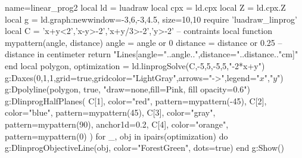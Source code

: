 \begin{luadraw}{name=linear_prog2}
local ld = luadraw
local cpx = ld.cpx
local Z = ld.cpx.Z
local g = ld.graph:new{window={-3,6,-3,4.5}, size={10,10}}
require 'luadraw_linprog'
local C = {'x+y<2','x-y>-2','x+y/3>-2','y>-2'} -- contraints
local function mypattern(angle, distance)
    angle = angle or 0
    distance = distance or 0.25 -- distance in centimeter
    return "{Lines[angle="..angle..",distance="..distance.."cm]}"
end
local polygon, optimization = ld.linprogSolve(C,-5,5,-5,5,{"-2*x+y"})
g:Daxes({0,1,1},{grid=true,gridcolor="LightGray",arrows="->",legend={"$x$","$y$"}})
g:Dpolyline(polygon, true, "draw=none,fill=Pink, fill opacity=0.6")
g:DlinprogHalfPlanes(
    C[1], {color="red", pattern=mypattern(-45)},
    C[2], {color="blue", pattern=mypattern(45)},
    C[3], {color="gray", pattern=mypattern(90), anchor1d=0.2},
    C[4], {color="orange", pattern=mypattern(0)}
    )
for _, obj in ipairs(optimization) do
    g:DlinprogObjectiveLine(obj, {color="ForestGreen", dots=true})
end
g:Show()
\end{luadraw}

